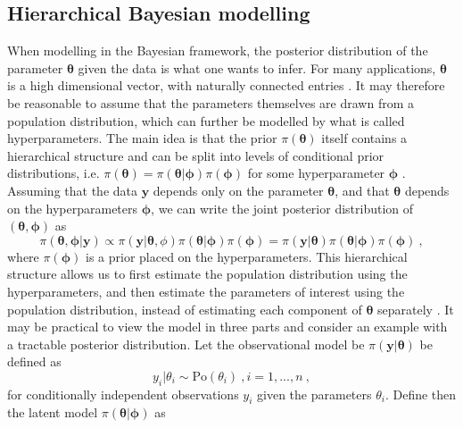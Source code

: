 \subsection{Hierarchical Bayesian modelling}
When modelling in the Bayesian framework, the posterior distribution of the parameter $\boldsymbol{\theta}$ given the data is what one wants to infer.
For many applications, $\boldsymbol{\theta}$ is a high dimensional vector, with naturally connected entries \citep{gelman2015Bayesian}.
It may therefore be reasonable to assume that the parameters themselves are drawn from a population distribution, which can further be modelled by what is called hyperparameters.
The main idea is that the prior $\pi(\boldsymbol{\theta})$ itself contains a hierarchical structure and can be split into levels of conditional prior distributions, i.e. $\pi(\boldsymbol{\theta}) =  \pi(\boldsymbol{\theta} \lvert \boldsymbol{\phi})\pi(\boldsymbol{\phi})$ for some hyperparameter $\boldsymbol{\phi}$ \citep{robert2007bayesian}.
Assuming that the data $\mathbf{y}$ depends only on the parameter $\boldsymbol{\theta}$, and that $\boldsymbol{\theta}$ depends on the hyperparameters $\boldsymbol{\phi}$, we can write the joint posterior distribution of $(\boldsymbol{\theta}, \boldsymbol{\phi})$ as
\begin{equation}
    \pi(\boldsymbol{\theta}, \boldsymbol{\phi} \lvert \mathbf{y}) \propto \pi(\mathbf{y} \lvert \boldsymbol{\theta}, \phi) \pi(\boldsymbol{\theta} \lvert \boldsymbol{\phi})\pi(\boldsymbol{\phi}) = \pi(\mathbf{y} \lvert \boldsymbol{\theta}) \pi(\boldsymbol{\theta} \lvert \boldsymbol{\phi})\pi(\boldsymbol{\phi}) \ ,
\end{equation}
where $\pi(\boldsymbol{\phi})$ is a prior placed on the hyperparameters. 
This hierarchical structure allows us to first estimate the population distribution using the hyperparameters, and then estimate the parameters of interest using the population distribution, instead of estimating each component of $\boldsymbol{\theta}$ separately \citep{gelman2015Bayesian}.
It may be practical to view the model in three parts and consider an example with a tractable posterior distribution. 
Let the observational model be $\pi(\mathbf{y} \lvert \boldsymbol{\theta})$ be defined as 
\begin{equation}
    y_i \lvert \theta_i \sim \text{Po}(\theta_i) \ , i = 1, ..., n \ ,
\end{equation}
for conditionally independent observations $y_i$ given the parameters $\theta_i$. 
Define then the latent model $\pi(\boldsymbol{\theta} \lvert \boldsymbol{\phi})$ as
